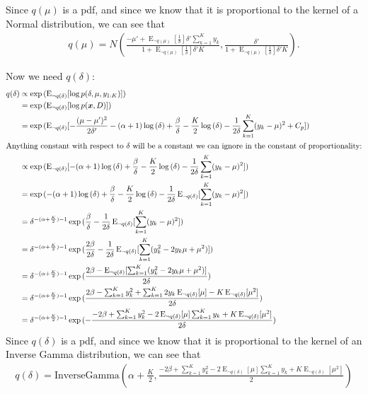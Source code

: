 \documentclass[12pt]{article}
\newcommand{\E}{\operatorname{E}}
\begin{document}
Since $q(\mu)$ is a pdf, and since we know that it is proportional to the kernel
of a Normal distribution, we can see that
\begin{align}\label{eq:qmu}
    q(\mu) = N\left(\frac{-\mu' + \E_{\neg q(\mu)}[\frac{1}{\delta}] \delta' \sum_{k=1}^{K}
    y_{k}}{1 + \E_{\neg q(\mu)}[\frac{1}{\delta}]\delta'K}, \frac{\delta'}{1 + \E_{\neg
    q(\mu)}[\frac{1}{\delta}]\delta'K}\right).
\end{align}

Now we need $q(\delta)$:
\begin{align}
    q(\delta) &\propto \exp{(\E_{\neg q(\delta)}[\log p(\delta, \mu, y_{1:K})])}
    \nonumber \\
    &= \exp{(\E_{\neg q(\delta)}[\log p(\bm{x}, D)])}
    \nonumber \\
    &= \exp{(\E_{\neg q(\delta)}[-\frac{(\mu-\mu')^2}{2\delta'}
    - (\alpha+1)\log{(\delta)} + \frac{\beta}{\delta}
    - \frac{K}{2}\log{(\delta)}
    - \frac{1}{2\delta} \sum_{k=1}^{K} (y_{k} - \mu)^2
    + C_p])}
    \nonumber \\
    \intertext{Anything constant with respect to $\delta$ will be a constant we can
    ignore in the constant of proportionality:}
    &\propto \exp{(\E_{\neg q(\delta)}[
    - (\alpha+1)\log{(\delta)} + \frac{\beta}{\delta}
    - \frac{K}{2}\log{(\delta)}
    - \frac{1}{2\delta} \sum_{k=1}^{K} (y_{k} - \mu)^2
    ])}
    \nonumber \\
    &= \exp{(
    - (\alpha+1)\log{(\delta)} + \frac{\beta}{\delta}
    - \frac{K}{2}\log{(\delta)}
    - \frac{1}{2\delta} \E_{\neg q(\delta)}[\sum_{k=1}^{K} (y_{k} - \mu)^2
    ])}
    \nonumber \\
    &= \delta^{-(\alpha+\frac{K}{2}) - 1}\exp{(
    \frac{\beta}{\delta}
    - \frac{1}{2\delta} \E_{\neg q(\delta)}[\sum_{k=1}^{K} (y_{k} - \mu)^2
    ])}
    \nonumber \\
    &= \delta^{-(\alpha+\frac{K}{2}) - 1}\exp{(
    \frac{2\beta}{2\delta}
    - \frac{1}{2\delta} \E_{\neg q(\delta)}[\sum_{k=1}^{K} (y_{k}^2 -2y_{k}\mu +
    \mu^2)
    ])}
    \nonumber \\
    &= \delta^{-(\alpha+\frac{K}{2}) - 1}\exp{(
    \frac{2\beta
    - \E_{\neg q(\delta)}[\sum_{k=1}^{K} (y_{k}^2 -2y_{k}\mu +
    \mu^2)]}{2\delta}
    )}
    \nonumber \\
    &= \delta^{-(\alpha+\frac{K}{2}) - 1}\exp{(
    \frac{2\beta
    - \sum_{k=1}^{K} y_{k}^2 + \sum_{k=1}^{K}2y_{k}
    \E_{\neg q(\delta)}[\mu] - K\E_{\neg q(\delta)}[\mu^2]}{2\delta}
    )}
    \nonumber \\
    &= \delta^{-(\alpha+\frac{K}{2}) - 1}\exp{(
    -\frac{-2\beta
    + \sum_{k=1}^{K} y_{k}^2 - 2\E_{\neg q(\delta)}[\mu] \sum_{k=1}^{K}y_{k}
    + K\E_{\neg q(\delta)}[\mu^2]}{2\delta}
    )}
\end{align}
Since $q(\delta)$ is a pdf, and since we know that it is proportional to the
kernel of an Inverse Gamma distribution, we can see that
\begin{align}\label{eq:qdelta}
    q(\delta) = \text{InverseGamma}\left(\alpha + \frac{K}{2},
    \frac{-2\beta + \sum_{k=1}^{K} y_{k}^{2} - 2 \E_{\neg q(\delta)}[\mu]
    \sum_{k=1}^{K} y_{k} + K\E_{\neg q(\delta)}[\mu^2]}{2}
    \right)
\end{align}
\end{document}

